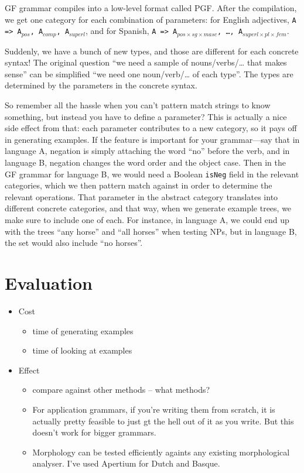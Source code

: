 \documentclass[11pt]{article}
\begin{document}
GF grammar compiles into a low-level format called PGF. After the
compilation, we get one category for each combination of parameters:
for English adjectives, \texttt{A => A$_{pos}$, A$_{comp}$,
A$_{superl}$}, and for Spanish, \texttt{A => A$_{pos×sg×masc}$, \dots,
A$_{superl×pl×fem}$}. 

Suddenly, we have a bunch of new types, and those are different for
each concrete syntax! The original question ``we need a sample of
nouns/verbs/… that makes sense'' can be simplified ``we need one
noun/verb/… of each type''. The types are determined by the parameters
in the concrete syntax. 

So remember all the hassle when you can't pattern match strings to
know something, but instead you have to define a parameter? This is
actually a nice side effect from that: each parameter contributes to a
new category, so it pays off in generating examples. If the feature is
important for your grammar---say that in language A, negation is
simply attaching the word  ``no'' before the verb, and in language B,
negation changes the word order and the object case. Then in the GF
grammar for language B, we would need a Boolean \texttt{isNeg} field
in the relevant categories, which we then pattern match against in
order to determine the relevant operations. That parameter in the
abstract category translates into different concrete categories, and
that way, when we generate example trees, we make sure to include one
of each. For instance, in language A, we could end up with the trees
``any horse'' and ``all horses'' when testing NPs, but in language B,
the set would also include ``no horses''. 



\section{Evaluation}


\begin{itemize}
\item Cost
  \begin{itemize}
  \item time of generating examples
  \item time of looking at examples
  \end{itemize}

\item Effect
  \begin{itemize}
  \item compare against other methods -- what methods?
  \item For application grammars, if you're writing them from scratch, it is actually pretty feasible to just gt the hell out of it as you write. But this doesn't work for bigger grammars.
  \item Morphology can be tested efficiently againts any existing morphological analyser. I've used Apertium for Dutch and Basque.
  \end{itemize}
\end{itemize}
\end{document}
